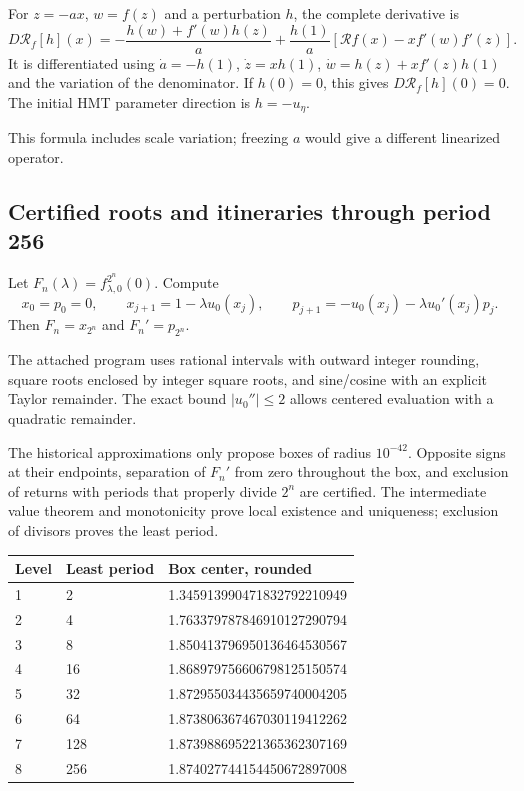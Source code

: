 For \(z=-ax\), \(w=f(z)\) and a perturbation \(h\), the complete derivative is
\[
\boxed{
D\mathcal R_f[h](x)=
-\frac{h(w)+f'(w)h(z)}a+
\frac{h(1)}a
\left[\mathcal Rf(x)-xf'(w)f'(z)\right].
}
\]
It is differentiated using \(\dot a=-h(1)\), \(\dot z=xh(1)\),
\(\dot w=h(z)+xf'(z)h(1)\) and the variation of the denominator. If \(h(0)=0\), this gives \(D\mathcal R_f[h](0)=0\). The initial HMT parameter direction is \(h=-u_\eta\).

This formula includes scale variation; freezing \(a\) would give a different linearized operator.


\subsection{Certified roots and itineraries through period 256}
\label{hmtfg:desarrollo:7}

Let \(F_n(\lambda)=f_{\lambda,0}^{2^n}(0)\). Compute
\[
x_0=p_0=0,\qquad x_{j+1}=1-\lambda u_0(x_j),\qquad
p_{j+1}=-u_0(x_j)-\lambda u_0'(x_j)p_j.
\]
Then \(F_n=x_{2^n}\) and \(F_n'=p_{2^n}\).

The attached program uses rational intervals with outward integer rounding, square roots enclosed by integer square roots, and sine/cosine with an explicit Taylor remainder. The exact bound \(|u_0''|\le2\) allows centered evaluation with a quadratic remainder.

The historical approximations only propose boxes of radius \(10^{-42}\). Opposite signs at their endpoints, separation of \(F_n'\) from zero throughout the box, and exclusion of returns with periods that properly divide \(2^n\) are certified. The intermediate value theorem and monotonicity prove local existence and uniqueness; exclusion of divisors proves the least period.

\begingroup\small
\begin{longtable}{p{.12\linewidth}p{.17\linewidth}p{.62\linewidth}}
\hline
Level & Least period & Box center, rounded \\
\hline
1 & 2 & 1.345913990471832792210949 \\
2 & 4 & 1.763379787846910127290794 \\
3 & 8 & 1.850413796950136464530567 \\
4 & 16 & 1.868979756606798125150574 \\
5 & 32 & 1.872955034435659740004205 \\
6 & 64 & 1.873806367467030119412262 \\
7 & 128 & 1.873988695221365362307169 \\
8 & 256 & 1.874027744154450672897008 \\
\hline\end{longtable}
\endgroup

